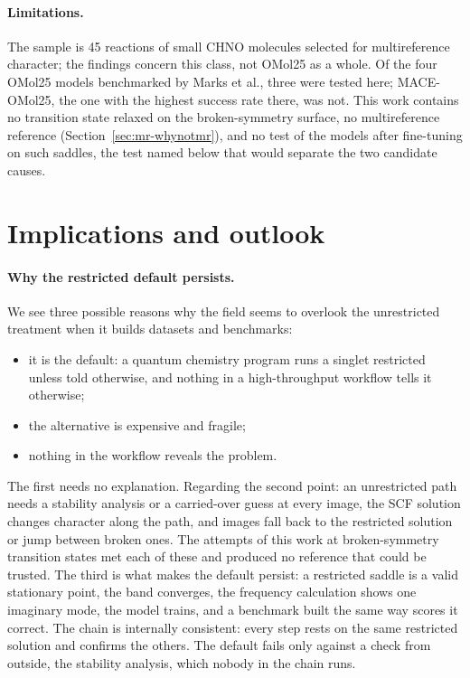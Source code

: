 \paragraph{Limitations.} The sample is 45 reactions of small CHNO
molecules selected for multireference character; the findings concern
this class, not OMol25 as a whole. Of the four OMol25 models
benchmarked by Marks et al., three were tested here; MACE-OMol25, the
one with the highest success rate there, was not. This work contains no transition
state relaxed on the broken-symmetry surface, no multireference
reference (Section~\ref{sec:mr-whynotmr}), and no test of the models
after fine-tuning on such saddles, the test named below that would
separate the two candidate causes.

\section{Implications and outlook}

\paragraph{Why the restricted default persists.} We see three possible reasons why
the field seems to overlook the unrestricted treatment when it builds
datasets and benchmarks:

\begin{itemize}
  \item it is the default: a quantum chemistry program runs a singlet
    restricted unless told otherwise, and nothing in a high-throughput
    workflow tells it otherwise;
  \item the alternative is expensive and fragile;
  \item nothing in the workflow reveals the problem.
\end{itemize}

The first needs no explanation. Regarding the second point: an
unrestricted path needs a stability analysis or a carried-over guess
at every image, the SCF solution changes character along the path, and
images fall back to the restricted solution or jump between broken
ones. The attempts of this work at broken-symmetry transition states
met each of these and produced no reference that could be trusted. The
third is what makes the default persist: a restricted saddle is a
valid stationary point, the band converges, the frequency calculation
shows one imaginary mode, the model trains, and a benchmark built the
same way scores it correct. The chain is internally
consistent: every step rests on the same restricted solution and
confirms the others. The default fails only against a check from
outside, the stability analysis, which nobody in the chain runs.


